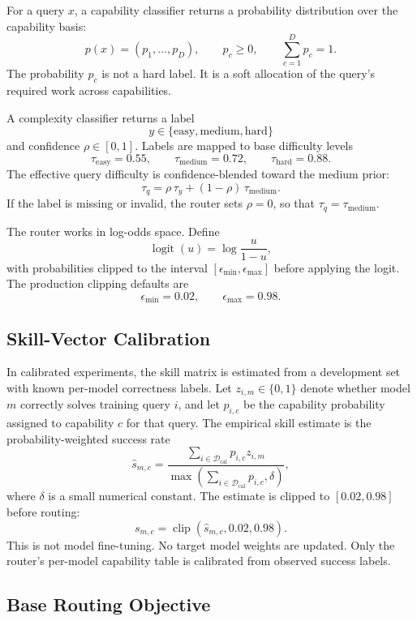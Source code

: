 For a query \(x\), a capability classifier returns a probability distribution
over the capability basis:
\[
  p(x) = (p_1,\ldots,p_D), \qquad
  p_c \ge 0,\qquad \sum_{c=1}^{D} p_c = 1.
\]
The probability \(p_c\) is not a hard label. It is a soft allocation of the
query's required work across capabilities.

A complexity classifier returns a label
\[
  y\in\{\mathrm{easy},\mathrm{medium},\mathrm{hard}\}
\]
and confidence \(\rho\in[0,1]\). Labels are mapped to base difficulty levels
\[
  \tau_{\mathrm{easy}}=0.55,\qquad
  \tau_{\mathrm{medium}}=0.72,\qquad
  \tau_{\mathrm{hard}}=0.88.
\]
The effective query difficulty is confidence-blended toward the medium prior:
\[
  \tau_q = \rho\,\tau_y + (1-\rho)\,\tau_{\mathrm{medium}}.
\]
If the label is missing or invalid, the router sets \(\rho=0\), so that
\(\tau_q=\tau_{\mathrm{medium}}\).

The router works in log-odds space. Define
\[
  \operatorname{logit}(u)=\log\frac{u}{1-u},
\]
with probabilities clipped to the interval \([\epsilon_{\min},\epsilon_{\max}]\)
before applying the logit. The production clipping defaults are
\[
  \epsilon_{\min}=0.02,\qquad \epsilon_{\max}=0.98.
\]

\subsection{Skill-Vector Calibration}
\label{sec:brick-skill-calibration}

In calibrated experiments, the skill matrix is estimated from a development
set with known per-model correctness labels. Let \(z_{i,m}\in\{0,1\}\) denote
whether model \(m\) correctly solves training query \(i\), and let \(p_{i,c}\)
be the capability probability assigned to capability \(c\) for that query.
The empirical skill estimate is the probability-weighted success rate
\[
  \widehat{s}_{m,c}
  =
  \frac{\sum_{i\in\mathcal{D}_{\mathrm{cal}}} p_{i,c} z_{i,m}}
       {\max\left(\sum_{i\in\mathcal{D}_{\mathrm{cal}}} p_{i,c},\delta\right)},
\]
where \(\delta\) is a small numerical constant. The estimate is clipped to
\([0.02,0.98]\) before routing:
\[
  s_{m,c}=\operatorname{clip}(\widehat{s}_{m,c},0.02,0.98).
\]
This is not model fine-tuning. No target model weights are updated. Only the
router's per-model capability table is calibrated from observed success labels.

\subsection{Base Routing Objective}
\label{sec:brick-base-objective}

